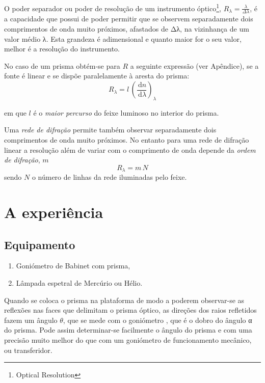 \documentclass[a4paper,12pt]{article}  %
\newcommand{\ud}{\,\mathrm{d}}
\begin{document}
O poder separador ou poder de resolução de um instrumento óptico\footnote{Optical Resolution}, $R_\lambda = \frac{\lambda}{\Delta \lambda} $,  é a capacidade que possui de poder permitir que se observem separadamente dois comprimentos de onda muito próximos, afastados de Δλ, na vizinhança de um valor médio λ. Esta grandeza é adimensional e quanto maior for o seu valor, melhor é a resolução do instrumento.

No caso de um prisma obtém-se para $R$ a seguinte expressão (ver Apêndice), se a fonte é linear e se dispõe paralelamente à aresta do prisma:
 \begin{equation}
	\label{eq:resolu}
	R_\lambda = l\,\left(\frac{\ud n}{\ud \lambda} \right)_\lambda 
\end{equation}

em que $l$ é o \emph{maior percurso} do feixe luminoso no interior do prisma.

Uma \emph{rede de difração}
permite também observar separadamente dois comprimentos de onda muito próximos.
No entanto para uma rede de difração linear a resolução além de variar com o comprimento de onda depende da \emph{ordem de difração}, $m$
 \begin{equation}
	\label{eq:resoludrifa}
	R_\lambda = m\,N 
\end{equation}
sendo $N$  o número de linhas da rede iluminadas pelo feixe.


\section{\sf A experiência}
\subsection{\sf Equipamento}

\begin{enumerate}
\item Goniómetro de Babinet com prisma,
\item Lâmpada espetral de Mercúrio ou Hélio.
\end{enumerate}

Quando se coloca o prisma na plataforma de modo a poderem observar-se as reflexões nas faces que delimitam o prisma óptico, as direções dos raios refletidos fazem um ângulo $\theta$, que se mede com o goniómetro , que é o dobro do ângulo α do prisma. Pode assim determinar-se facilmente o ângulo do prisma e com uma precisão muito melhor do que com um goniómetro de funcionamento mecânico, ou transferidor.
\end{document}
